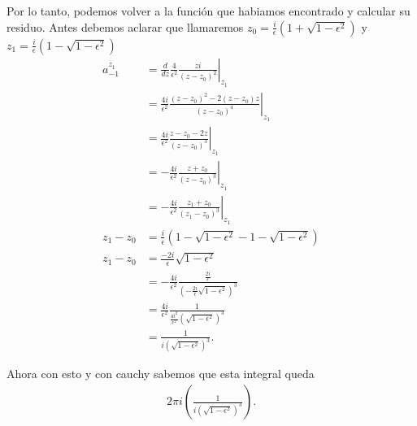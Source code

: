 \documentclass{report}
\begin{document}
  Por lo tanto, podemos volver a la función que habiamos encontrado y calcular su residuo. Antes debemos aclarar que llamaremos $z_0=\frac{i}{\epsilon}\left( 1+\sqrt{1-\epsilon^2}  \right) $ y $z_1 = \frac{i}{\epsilon}\left( 1-\sqrt{1-\epsilon^2}  \right) $
  \begin{align*}
    a_{-1}^{z_1}&= \frac{d}{dz}\left. \frac{4}{\epsilon^2}\frac{zi}{\left( z-z_0 \right)^2} \right|_{z_1}  \\
      &= \left.\frac{4i}{\epsilon^2}\frac{\left( z-z_0 \right)^2- 2\left( z-z_0 \right)z }{\left( z-z_0 \right)^{4}}\right|_{z_1} \\
	&= \left.\frac{4i}{\epsilon^2}\frac{z-z_0-2z}{\left( z-z_0 \right)^{3}}\right|_{z_1} \\
	  &= \left.-\frac{4i}{\epsilon^2}\frac{z+z_0}{\left( z-z_0 \right)^{3}}\right|_{z_1} \\
	  &= \left.-\frac{4i}{\epsilon^2}\frac{z_1+z_0}{\left( z_1-z_0 \right)^{3}}\right|_{z_1} \\
      z_1-z_0 &= \frac{i}{\epsilon}\left( 1-\sqrt{1-\epsilon^2} -1-\sqrt{1-\epsilon^2}  \right) \\
      z_1-z_0&=\frac{-2i}{\epsilon}\sqrt{1-\epsilon^2} \\
	  &= -\frac{4i}{\epsilon^2}\frac{\frac{2i}{\epsilon}}{\left( -\frac{2i}{\epsilon}\sqrt{1-\epsilon^2}  \right)^{3}} \\
	  &= \frac{4i}{\epsilon^2}\frac{1}{\frac{4i^2}{\epsilon^2}\left( \sqrt{1-\epsilon^2}  \right)^{3}} \\
	  &= \frac{1}{i\left( \sqrt{1-\epsilon^2}  \right)^{3} }
  .\end{align*}

  Ahora con esto y con cauchy sabemos que esta integral queda
  \begin{align*}
    2\pi i \left( \frac{1}{i\left( \sqrt{1-\epsilon^2}  \right)^{3}} \right) 
  .\end{align*}
\end{document}
